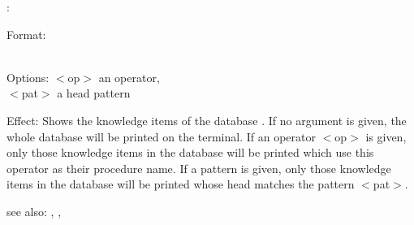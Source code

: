:

Format: \\
        \\

Options: $<$op$>$ an operator,\\
         $<$pat$>$ a head pattern

Effect: Shows the knowledge items of the database . If no
	argument is given, the whole database will be printed on the terminal. 
	If an operator $<$op$>$ is given, only those knowledge items in the 
	database will be printed which use this operator as their procedure 
	name. If a pattern is given, only those knowledge items in the database 
	will be printed whose head matches the pattern $<$pat$>$.

see also: \consult, , \listing
